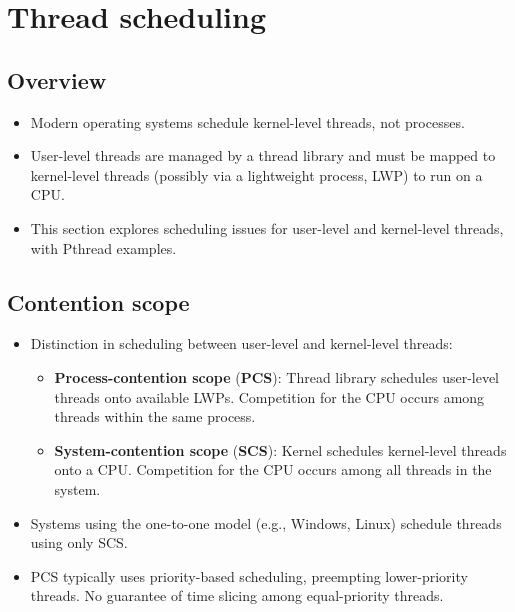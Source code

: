 \section{Thread scheduling}\label{sec:5.4}

\subsection{Overview}
\begin{itemize}
    \item Modern operating systems schedule kernel-level threads, not processes.
    \item User-level threads are managed by a thread library and must be mapped to kernel-level threads (possibly via a lightweight process, LWP) to run on a CPU.
    \item This section explores scheduling issues for user-level and kernel-level threads, with Pthread examples.
\end{itemize}

\subsection{Contention scope}
\begin{itemize}
    \item Distinction in scheduling between user-level and kernel-level threads:
        \begin{itemize}
            \item \textbf{Process-contention scope} (\textbf{PCS}): Thread library schedules user-level threads onto available LWPs. Competition for the CPU occurs among threads within the same process.
            \item \textbf{System-contention scope} (\textbf{SCS}): Kernel schedules kernel-level threads onto a CPU. Competition for the CPU occurs among all threads in the system.
        \end{itemize}
    \item Systems using the one-to-one model (e.g., Windows, Linux) schedule threads using only SCS.
    \item PCS typically uses priority-based scheduling, preempting lower-priority threads. No guarantee of time slicing among equal-priority threads.
\end{itemize}

